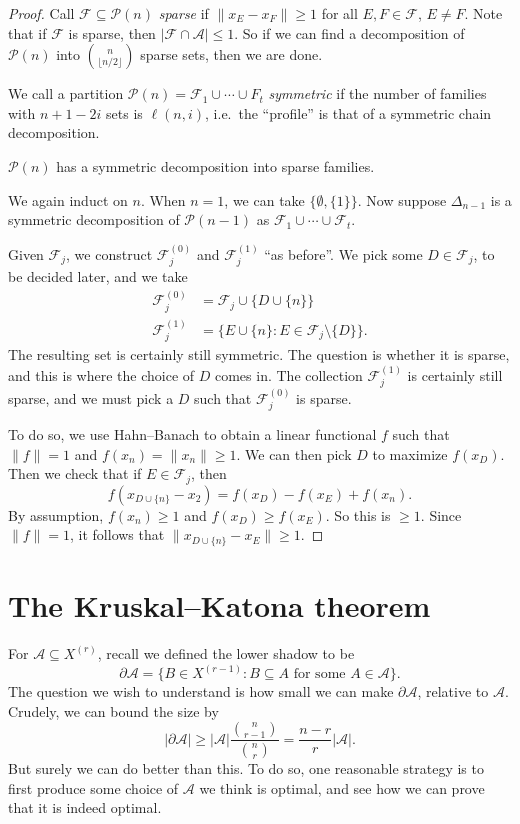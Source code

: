 \documentclass[a4paper]{article}
\begin{document}
\begin{proof}
  Call $\mathcal{F} \subseteq \mathcal{P}(n)$ \emph{sparse} if $\|x_E - x_F\| \geq 1$ for all $E, F \in \mathcal{F}$, $E \not= F$. Note that if $\mathcal{F}$ is sparse, then $|\mathcal{F} \cap \mathcal{A}| \leq 1$. So if we can find a decomposition of $\mathcal{P}(n)$ into $\binom{n}{\lfloor n/2\rfloor}$ sparse sets, then we are done.

  We call a partition $\mathcal{P}(n) = \mathcal{F}_1 \cup \cdots \cup F_t$ \emph{symmetric} if the number of families with $n + 1 - 2i$ sets is $\ell(n, i)$, i.e.\ the ``profile'' is that of a symmetric chain decomposition.

  \begin{claim}
    $\mathcal{P}(n)$ has a symmetric decomposition into sparse families.
  \end{claim}

  We again induct on $n$. When $n = 1$, we can take $\{\emptyset, \{1\}\}$. Now suppose $\Delta_{n - 1}$ is a symmetric decomposition of $\mathcal{P}(n - 1)$ as $\mathcal{F}_1 \cup \cdots \cup \mathcal{F}_t$.

  Given $\mathcal{F}_j$, we construct $\mathcal{F}_j^{(0)}$ and $\mathcal{F}_j^{(1)}$ ``as before''. We pick some $D \in \mathcal{F}_j$, to be decided later, and we take
  \begin{align*}
    \mathcal{F}_j^{(0)} &= \mathcal{F}_j \cup\{ D \cup \{n\}\}\\
    \mathcal{F}_j^{(1)} &= \{ E \cup \{n\}: E \in \mathcal{F}_j \setminus \{D\}\}.
  \end{align*}
  The resulting set is certainly still symmetric. The question is whether it is sparse, and this is where the choice of $D$ comes in. The collection $\mathcal{F}_j^{(1)}$ is certainly still sparse, and we must pick a $D$ such that $\mathcal{F}_j^{(0)}$ is sparse.

  To do so, we use Hahn--Banach to obtain a linear functional $f$ such that $\|f\| = 1$ and $f(x_n) = \|x_n\| \geq 1$. We can then pick $D$ to maximize $f(x_D)$. Then we check that if $E \in \mathcal{F}_j$, then
  \[
    f(x_{D \cup \{n\}} - x_2) = f(x_D) - f(x_E) + f(x_n).
  \]
  By assumption, $f(x_n) \geq 1$ and $f(x_D) \geq f(x_E)$. So this is $\geq 1$. Since $\|f\| = 1$, it follows that $\|x_{D \cup \{n\}} - x_E\| \geq 1$.
\end{proof}

\section{The Kruskal--Katona theorem}
For $\mathcal{A} \subseteq X^{(r)}$, recall we defined the lower shadow to be
\[
  \partial \mathcal{A} = \{B \in X^{(r - 1)} : B \subseteq A \text{ for some } A \in \mathcal{A}\}.
\]
The question we wish to understand is how small we can make $\partial \mathcal{A}$, relative to $\mathcal{A}$. Crudely, we can bound the size by
\[
  |\partial \mathcal{A}| \geq |\mathcal{A}| \frac{\binom{n}{r - 1}}{\binom{n}{r}} = \frac{n - r}{r} |\mathcal{A}|.
\]
But surely we can do better than this. To do so, one reasonable strategy is to first produce some choice of $\mathcal{A}$ we think is optimal, and see how we can prove that it is indeed optimal.
\end{document}
